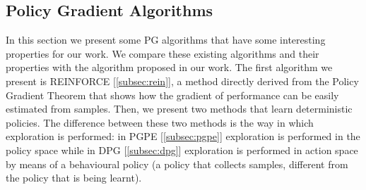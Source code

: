 \subsection{Policy Gradient Algorithms} \label{subsec:alg}
In this section we present some \ac{PG} algorithms that have some interesting properties for our work. We compare these existing algorithms and their properties with the algorithm proposed in our work. The first algorithm we present is REINFORCE [\ref{subsec:rein}], a method directly derived from the Policy Gradient Theorem that shows how the gradient of performance can be easily estimated from samples. Then, we present two methods that learn deterministic policies. The difference between these two methods is the way in which exploration is performed: in \acf{PGPE} [\ref{subsec:pgpe}] exploration is performed in the policy space while in \acf{DPG} [\ref{subsec:dpg}] exploration is performed in action space by means of a behavioural policy (\ie a policy that collects samples, different from the policy that is being learnt).

